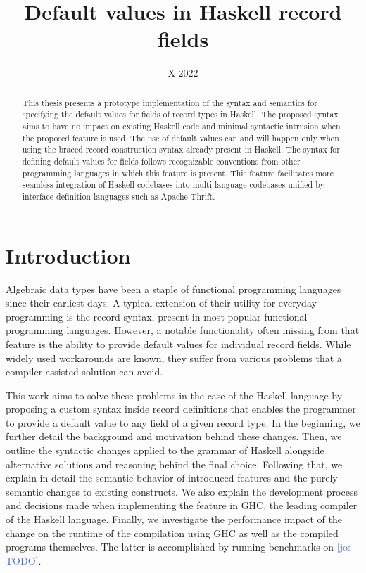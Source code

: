 \documentclass[en]{pracamgr}
\title{Default values in Haskell record fields}
\date{X 2022}
\newcommand{\jcom}[1]{\textcolor{RoyalBlue}{[jo: #1]}}
\begin{document}
\maketitle

\begin{abstract}
  This thesis presents a prototype implementation of the syntax
  and semantics for specifying the default values for fields 
  of record types in Haskell. The proposed syntax aims to have
  no impact on existing Haskell code and minimal syntactic intrusion
  when the proposed feature is used. The use of default values
  can and will happen only when using the braced record construction
  syntax already present in Haskell. The syntax for defining default 
  values for fields follows recognizable conventions from other
  programming languages in which this feature is present.
  This feature facilitates more seamless integration of Haskell codebases 
  into multi-language codebases unified
  by interface definition languages such as Apache Thrift. 
\end{abstract}

\tableofcontents

\chapter*{Introduction}

Algebraic data types have been a staple of functional programming languages since their earliest days.
A typical extension of their utility for everyday programming is the record syntax, present in most popular functional programming languages.
However, a notable functionality often missing from that feature is the ability to provide default values for individual record fields.
While widely used workarounds are known, they suffer from various problems that a compiler-assisted solution can avoid.

This work aims to solve these problems in the case of the Haskell language by proposing a custom syntax inside record definitions that enables the programmer to provide a default value to any field of a given record type.
In the beginning, we further detail the background and motivation behind these changes. 
Then, we outline the syntactic changes applied to the grammar of Haskell alongside alternative solutions and reasoning behind the final choice.
Following that, we explain in detail the semantic behavior of introduced features and the purely semantic changes to existing constructs.
We also explain the development process and decisions made when implementing the feature in GHC, the leading compiler of the Haskell language.
Finally, we investigate the performance impact of the change on the runtime of the compilation using GHC as well as the compiled programs themselves.
The latter is accomplished by running benchmarks on \jcom{TODO}.
\end{document}
